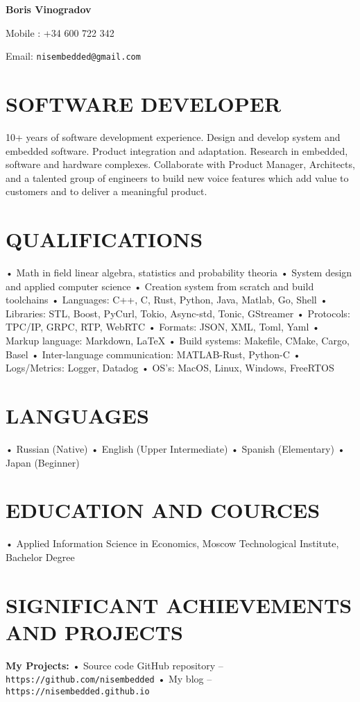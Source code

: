 \documentclass{article}
\begin{document}
\textbf{Boris Vinogradov}

Mobile : +34 600 722 342

Email: \texttt{nisembedded@gmail.com}

\section{\textsf{SOFTWARE DEVELOPER}}
10+ years of software development experience. Design and develop system and embedded software. Product
integration and adaptation. Research in embedded, software and hardware complexes. Collaborate with Product
Manager, Architects, and a talented group of engineers to build new voice features which add value to customers
and to deliver a meaningful product.

\section{\textsf{QUALIFICATIONS}}
• Math in field linear algebra, statistics and probability theoria
• System design and applied computer science
• Creation system from scratch and build toolchains
• Languages: C++, C, Rust, Python, Java, Matlab, Go, Shell
• Libraries: STL, Boost, PyCurl, Tokio, Async-std, Tonic, GStreamer
• Protocols: TPC/IP, GRPC, RTP, WebRTC
• Formats: JSON, XML, Toml, Yaml
• Markup language: Markdown, \LaTeX
• Build systems: Makefile, CMake, Cargo, Basel
• Inter-language communication: MATLAB-Rust, Python-C
• Logs/Metrics: Logger, Datadog
• OS’s: MacOS, Linux, Windows, FreeRTOS

\section{\textsf{LANGUAGES}}
• Russian (Native)
• English (Upper Intermediate)
• Spanish (Elementary)
• Japan (Beginner)

\section{\textsf{EDUCATION AND COURCES}}
• Applied Information Science in Economics, Moscow Technological Institute, Bachelor Degree

\section{\textsf{SIGNIFICANT ACHIEVEMENTS AND PROJECTS}}

\textbf{My Projects:}
• Source code GitHub repository – \texttt{https://github.com/nisembedded}
• My blog – \texttt{https://nisembedded.github.io}
\end{document}
